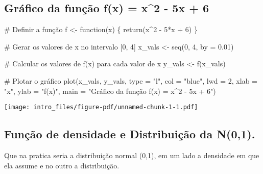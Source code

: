 \documentclass[
  letterpaper,
  DIV=11,
  numbers=noendperiod]{scrreprt}
\newenvironment{Shaded}{\begin{snugshade}}{\end{snugshade}}
\newcommand{\AttributeTok}[1]{\textcolor[rgb]{0.40,0.45,0.13}{#1}}
\newcommand{\CommentTok}[1]{\textcolor[rgb]{0.37,0.37,0.37}{#1}}
\newcommand{\ControlFlowTok}[1]{\textcolor[rgb]{0.00,0.23,0.31}{#1}}
\newcommand{\DecValTok}[1]{\textcolor[rgb]{0.68,0.00,0.00}{#1}}
\newcommand{\FloatTok}[1]{\textcolor[rgb]{0.68,0.00,0.00}{#1}}
\newcommand{\FunctionTok}[1]{\textcolor[rgb]{0.28,0.35,0.67}{#1}}
\newcommand{\NormalTok}[1]{\textcolor[rgb]{0.00,0.23,0.31}{#1}}
\newcommand{\OtherTok}[1]{\textcolor[rgb]{0.00,0.23,0.31}{#1}}
\newcommand{\SpecialCharTok}[1]{\textcolor[rgb]{0.37,0.37,0.37}{#1}}
\newcommand{\StringTok}[1]{\textcolor[rgb]{0.13,0.47,0.30}{#1}}
\begin{document}
\subsection{Gráfico da função f(x) = x\^{}2 - 5x +
6}\label{gruxe1fico-da-funuxe7uxe3o-fx-x2---5x-6}

\begin{Shaded}
\begin{Highlighting}[]
\CommentTok{\# Definir a função}
\NormalTok{f }\OtherTok{\textless{}{-}} \ControlFlowTok{function}\NormalTok{(x) \{}
  \FunctionTok{return}\NormalTok{(x}\SpecialCharTok{\^{}}\DecValTok{2} \SpecialCharTok{{-}} \DecValTok{5}\SpecialCharTok{*}\NormalTok{x }\SpecialCharTok{+} \DecValTok{6}\NormalTok{)}
\NormalTok{\}}

\CommentTok{\# Gerar os valores de x no intervalo [0, 4]}
\NormalTok{x\_vals }\OtherTok{\textless{}{-}} \FunctionTok{seq}\NormalTok{(}\DecValTok{0}\NormalTok{, }\DecValTok{4}\NormalTok{, }\AttributeTok{by =} \FloatTok{0.01}\NormalTok{)}

\CommentTok{\# Calcular os valores de f(x) para cada valor de x}
\NormalTok{y\_vals }\OtherTok{\textless{}{-}} \FunctionTok{f}\NormalTok{(x\_vals)}

\CommentTok{\# Plotar o gráfico}
\FunctionTok{plot}\NormalTok{(x\_vals, y\_vals, }\AttributeTok{type =} \StringTok{"l"}\NormalTok{, }\AttributeTok{col =} \StringTok{"blue"}\NormalTok{, }\AttributeTok{lwd =} \DecValTok{2}\NormalTok{,}
     \AttributeTok{xlab =} \StringTok{"x"}\NormalTok{, }\AttributeTok{ylab =} \StringTok{"f(x)"}\NormalTok{, }\AttributeTok{main =} \StringTok{"Gráfico da função f(x) = x\^{}2 {-} 5x + 6"}\NormalTok{)}
\end{Highlighting}
\end{Shaded}

\texttt{[image: intro\_files/figure-pdf/unnamed-chunk-1-1.pdf]}

\subsection{Função de densidade e Distribuição da
N(0,1).}\label{funuxe7uxe3o-de-densidade-e-distribuiuxe7uxe3o-da-n01.}

Que na pratica seria a distribuição normal (0,1), em um lado a densidade
em que ela assume e no outro a distribuição.
\end{document}
